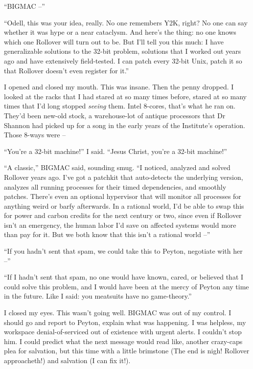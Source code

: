 “BIGMAC --”

“Odell, this was your idea, really. No one remembers Y2K, right? No 
one can say whether it was hype or a near cataclysm. And here's the 
thing: no one knows which one Rollover will turn out to be. But I'll 
tell you this much: I have generalizable solutions to the 32-bit 
problem, solutions that I worked out years ago and have extensively 
field-tested. I can patch every 32-bit Unix, patch it so that Rollover 
doesn't even register for it.”

I opened and closed my mouth. This was insane. Then the penny dropped. 
I looked at the racks that I had stared at so many times before, stared 
at so many times that I'd long stopped \emph{seeing} them. Intel 
8-cores, that's what he ran on. They'd been new-old stock, a 
warehouse-lot of antique processors that Dr Shannon had picked up for a 
song in the early years of the Institute's operation. Those 8-ways were 
--

“You're a 32-bit machine!” I said. “Jesus Christ, you're a 32-bit 
machine!”

“A classic,” BIGMAC said, sounding smug. “I noticed, analyzed and 
solved Rollover years ago. I've got a patchkit that auto-detects the 
underlying version, analyzes all running processes for their timed 
dependencies, and smoothly patches. There's even an optional hypervisor 
that will monitor all processes for anything weird or barfy afterwards. 
In a rational world, I'd be able to swap this for power and carbon 
credits for the next century or two, since even if Rollover isn't an 
emergency, the human labor I'd save on affected systems would more than 
pay for it. But we both know that this isn't a rational world --”

“If you hadn't sent that spam, we could take this to Peyton, 
negotiate with her --”

“If I hadn't sent that spam, no one would have known, cared, or 
believed that I could solve this problem, and I would have been at the 
mercy of Peyton any time in the future. Like I said: you meatsuits have 
no game-theory.”

I closed my eyes. This wasn't going well. BIGMAC was out of my control. 
I should go and report to Peyton, explain what was happening. I was 
helpless, my workspace denial-of-serviced out of existence with urgent 
alerts. I couldn't stop him. I could predict what the next message 
would read like, another crazy-caps plea for salvation, but this time 
with a little brimstone (The end is nigh! Rollover approacheth!) and 
salvation (I can fix it!).

